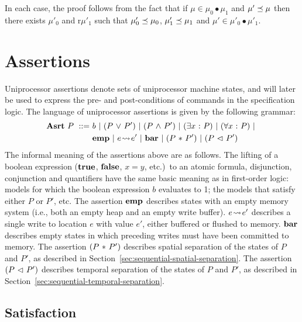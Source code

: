 \documentclass[11pt]{report}
\begin{document}
In each case, the proof follows from the fact that if $\mu \in \mu_0 \bullet \mu_1$ and $\mu' \preceq \mu$ then there exists $\mu'_0$ and r$\mu'_1$ such that $\mu'_0 \preceq \mu_0$, $\mu'_1 \preceq \mu_1$ and $\mu' \in \mu'_0 \bullet \mu'_1$. 

\section{Assertions}
\label{sec:uniprocessor-assertions}

Uniprocessor assertions denote sets of uniprocessor machine states, and will later be used to express the pre- and post-conditions of commands in the specification logic. The language of uniprocessor assertions is given by the following grammar: \begin{align*}
    \mathbf{Asrt}~P ~::=~ & b ~|~ (P \operatorname{\,\vee\,} P') ~|~ (P \operatorname{\,\wedge\,} P') ~|~ (\exists x \operatorname{\,:\,} P) ~|~ (\forall x \operatorname{\,:\,} P) ~|~ \\ & \mathbf{emp} ~|~ e \!\leadsto\! e' ~|~ \mathbf{bar} ~|~ (P \operatorname{\,\ast\,} P') ~|~  (P \operatorname{\,\vartriangleleft\,} P')
\end{align*} 
The informal meaning of the assertions above are as follows. The lifting of a boolean expression ($\mathbf{true}$, $\mathbf{false}$, $x = y$, etc.)\ to an atomic formula, disjunction, conjunction and quantifiers have the same basic meaning as in first-order logic: models for which the boolean expression $b$ evaluates to 1; the models that satisfy either $P$ or $P'$, etc. The assertion $\mathbf{emp}$ describes states with an empty memory system (i.e., both an empty heap and an empty write buffer). $e \!\leadsto\! e'$ describes a single write to location $e$ with value $e'$, either buffered or flushed to memory. $\mathbf{bar}$ describes empty states in which preceding writes must have been committed to memory. The assertion $(P \operatorname{\,\ast\,} P')$ describes spatial separation of the states of $P$ and $P'$, as described in Section~\ref{sec:sequential-spatial-separation}. The assertion $(P \operatorname{\,\vartriangleleft\,} P')$ describes temporal separation of the states of $P$ and $P'$, as described in Section~\ref{sec:sequential-temporal-separation}. 

\subsection{Satisfaction}
\label{sec:uniprocessor-satisfaction}
\end{document}
